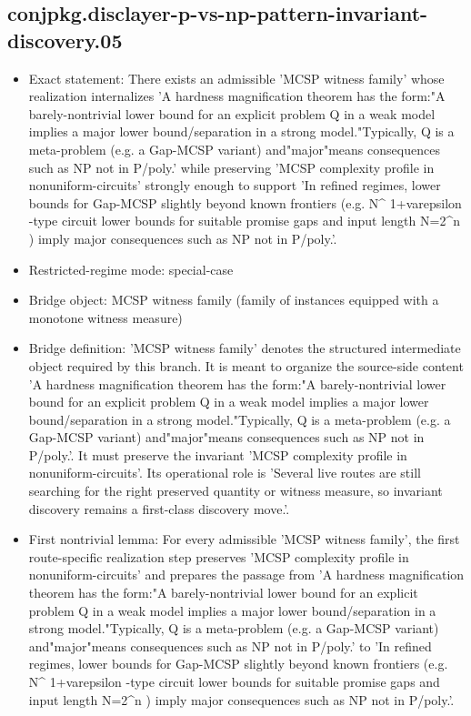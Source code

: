 \documentclass[11pt]{article}
\begin{document}
\subsection*{conjpkg.disclayer-p-vs-np-pattern-invariant-discovery.05}
\begin{itemize}
\item Exact statement: There exists an admissible 'MCSP witness family' whose realization internalizes 'A hardness magnification theorem has the form:"A barely-nontrivial lower bound for an explicit problem Q in a weak model implies a major lower bound/separation in a strong model."Typically, Q is a meta-problem (e.g. a Gap-MCSP variant) and"major"means consequences such as NP not in P/poly.' while preserving 'MCSP complexity profile in nonuniform-circuits' strongly enough to support 'In refined regimes, lower bounds for Gap-MCSP slightly beyond known frontiers (e.g. N\textasciicircum{} 1+varepsilon -type circuit lower bounds for suitable promise gaps and input length N=2\textasciicircum{}n ) imply major consequences such as NP not in P/poly.'.
\item Restricted-regime mode: special-case
\item Bridge object: MCSP witness family (family of instances equipped with a monotone witness measure)
\item Bridge definition: 'MCSP witness family' denotes the structured intermediate object required by this branch. It is meant to organize the source-side content 'A hardness magnification theorem has the form:"A barely-nontrivial lower bound for an explicit problem Q in a weak model implies a major lower bound/separation in a strong model."Typically, Q is a meta-problem (e.g. a Gap-MCSP variant) and"major"means consequences such as NP not in P/poly.'. It must preserve the invariant 'MCSP complexity profile in nonuniform-circuits'. Its operational role is 'Several live routes are still searching for the right preserved quantity or witness measure, so invariant discovery remains a first-class discovery move.'.
\item First nontrivial lemma: For every admissible 'MCSP witness family', the first route-specific realization step preserves 'MCSP complexity profile in nonuniform-circuits' and prepares the passage from 'A hardness magnification theorem has the form:"A barely-nontrivial lower bound for an explicit problem Q in a weak model implies a major lower bound/separation in a strong model."Typically, Q is a meta-problem (e.g. a Gap-MCSP variant) and"major"means consequences such as NP not in P/poly.' to 'In refined regimes, lower bounds for Gap-MCSP slightly beyond known frontiers (e.g. N\textasciicircum{} 1+varepsilon -type circuit lower bounds for suitable promise gaps and input length N=2\textasciicircum{}n ) imply major consequences such as NP not in P/poly.'.

\end{itemize}
\end{document}

